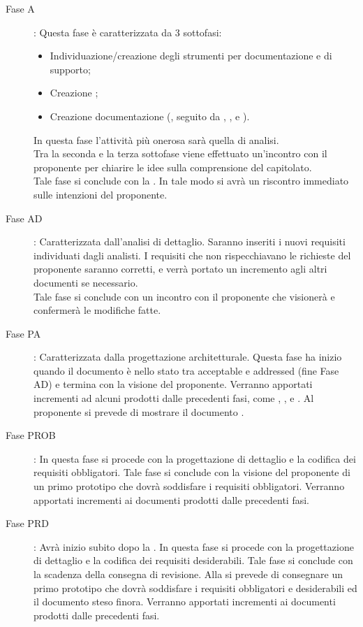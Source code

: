 		\begin{description}
			\item[Fase A]: Questa fase è caratterizzata da 3 sottofasi:
				\begin{itemize}
					\item Individuazione/creazione degli strumenti per documentazione e di supporto;
					\item Creazione ;
					\item Creazione documentazione (, seguito da , ,  e ).
				\end{itemize}
				In questa fase l'attività più onerosa sarà quella di analisi.\\Tra la seconda e la terza sottofase viene effettuato un'incontro con il proponente per chiarire le idee sulla comprensione del capitolato.\\Tale fase si conclude con la . In tale modo si avrà un riscontro immediato sulle intenzioni del proponente.
			\item[Fase AD]: Caratterizzata dall’analisi di dettaglio. Saranno inseriti i nuovi requisiti individuati dagli analisti. I requisiti che non rispecchiavano le richieste del proponente saranno corretti, e verrà portato un incremento agli altri documenti se necessario.\\Tale fase si conclude con un incontro con il proponente che visionerà e confermerà le modifiche fatte.
			\item[Fase PA]: Caratterizzata dalla progettazione architetturale. Questa fase ha inizio quando il documento  è nello stato tra acceptable e addressed (fine Fase AD) e termina con la visione del proponente. Verranno apportati incrementi ad alcuni prodotti dalle precedenti fasi, come , ,  e . Al proponente si prevede di mostrare il documento .
			\item[Fase PROB]: In questa fase si procede con la progettazione di dettaglio e la codifica dei requisiti obbligatori. Tale fase si conclude con la visione del proponente di un primo prototipo che dovrà soddisfare i requisiti obbligatori. Verranno apportati incrementi ai documenti prodotti dalle precedenti fasi.
			\item[Fase PRD]: Avrà inizio subito dopo la . In questa fase si procede con la progettazione di dettaglio e la codifica dei requisiti desiderabili. Tale fase si conclude con la scadenza della consegna di revisione. Alla  si prevede di consegnare un primo prototipo che dovrà soddisfare i requisiti obbligatori e desiderabili ed il documento  steso finora. Verranno apportati incrementi ai documenti prodotti dalle precedenti fasi.

\end{description}
